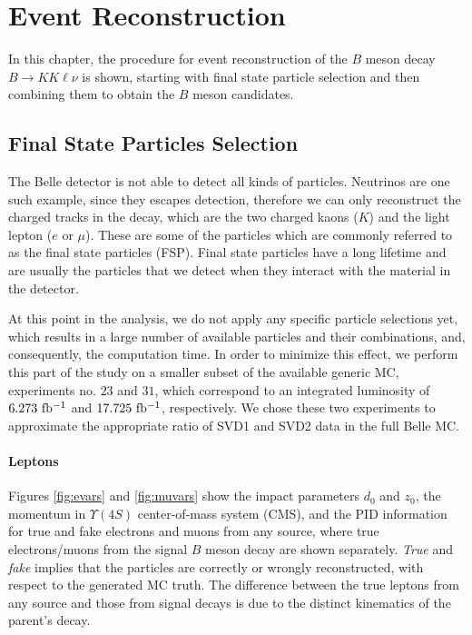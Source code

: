 \chapter{Event Reconstruction}

In this chapter, the procedure for event reconstruction of the $B$ meson decay $B \to K K \ell \nu$ is shown, starting with final state particle selection and then combining them to obtain the $B$ meson candidates.

\section{Final State Particles Selection}
The Belle detector is not able to detect all kinds of particles. Neutrinos are one such example, since they escapes detection, therefore we can only reconstruct the charged tracks in the decay, which are the two charged kaons ($K$) and the light lepton ($e$ or $\mu$). These are some of the particles which are commonly referred to as the final state particles (FSP). Final state particles have a long lifetime and are usually the particles that we detect when they interact with the material in the detector.

At this point in the analysis, we do not apply any specific particle selections yet, which results in a large number of available particles and their combinations, and, consequently, the computation time. In order to minimize this effect, we perform this part of the study on a smaller subset of the available generic MC, experiments no. $23$ and $31$, which correspond to an integrated luminosity of $6.273\mathrm{~fb^{-1}}$ and $17.725\mathrm{~fb^{-1}}$, respectively. We chose these two experiments to approximate the appropriate ratio of SVD1 and SVD2 data in the full Belle MC.

\subsubsection{Leptons}

Figures \ref{fig:evars} and \ref{fig:muvars} show the impact parameters $d_0$ and $z_0$, the momentum in  $\Upsilon(4S)$ center-of-mass system (CMS), and the PID information for true and fake electrons and muons from any source, where true electrons/muons from the signal $B$ meson decay are shown separately. \textit{True} and \textit{fake} implies that the particles are correctly or wrongly reconstructed, with respect to the generated MC truth. The difference between the true leptons from any source and those from signal decays is due to the distinct kinematics of the parent's decay.

